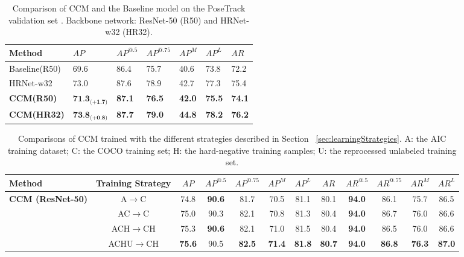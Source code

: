 \documentclass[twocolumn]{svjour3}          \smartqed  \usepackage{natbib}
\begin{document}
\begin{table}[htbp]
\centering
  \caption{Comparison of CCM and the Baseline model on the PoseTrack validation set \citep{Andriluka2018PoseTrack}. Backbone network: ResNet-50 (R50) and HRNet-w32 (HR32).}
\begin{tabular}{p{1.7cm}p{0.8cm}<{\centering}p{0.7cm}<{\centering}p{0.8cm}<{\centering}p{0.6cm}<{\centering}p{0.6cm}<{\centering}p{0.4cm}<{\centering}}
    \toprule
    Method    & $AP$    & $AP^{@.5}$  & $AP^{@.75}$  & $AP^M$   & $AP^L$ & $AR$ \\
    \midrule
    Baseline(R50)  & 69.6  & 86.4  & 75.7  & 40.6  & 73.8 & 72.2\\
    HRNet-w32 & 73.0  & 87.6  & 78.9  & 42.7  & 77.3 & 75.4\\
    \midrule
    \textbf{CCM(R50)} & $\textbf{71.3}_{\textbf{(+1.7)}}$  & \textbf{87.1}  & \textbf{76.5}  & \textbf{42.0}  & \textbf{75.5} & \textbf{74.1} \\
    \textbf{CCM(HR32)} & $\textbf{73.8}_{\textbf{(+0.8)}}$  & \textbf{87.7}  & \textbf{79.0}  & \textbf{44.8}  & \textbf{78.2} & \textbf{76.2} \\
    \bottomrule
    \end{tabular}\label{tab:posetrack}\end{table}

\begin{table*}[htbp]
\centering
  \caption{Comparisons of CCM trained with the different strategies described in Section ~\ref{sec:learningStrategies}. A: the AIC training dataset; C: the COCO training set; H: the hard-negative training samples; U: the reprocessed unlabeled training set.}
    \begin{tabular}{lccccccccccc}
\toprule
      Method  & Training Strategy  & $AP$    & $AP^{@.5}$  & $AP^{@.75}$  & $AP^M$   & $AP^L$   & $AR$ & $AR^{@.5}$  & $AR^{@.75}$ & $AR^M$ & $AR^L$\\
    \midrule
    \multicolumn{1}{c}{\multirow{4}[0]{*}{\textbf{CCM (ResNet-50)}}} & A$\to$C &  74.8  & \textbf{90.6}  & 81.7  & 70.5  & 81.1  & 80.1  & \textbf{94.0}  & 86.1  & 75.7  & 86.5\\
    \multicolumn{1}{c}{} & AC$\to$C &  75.0  & 90.3  & 82.1  & 70.8  & 81.3  & 80.4  & \textbf{94.0}  & 86.7  & 76.0  & 86.6  \\
    \multicolumn{1}{c}{} & ACH$\to$CH &   75.3  & \textbf{90.6}  & 82.1  & 71.0  & 81.5  & 80.4  & \textbf{94.0}  & 86.5  & 76.0  & 86.6  \\
    \multicolumn{1}{c}{} & ACHU$\to$CH &  \textbf{75.6}  & 90.5  & \textbf{82.5}  & \textbf{71.4}  & \textbf{81.8}  & \textbf{80.7}  & \textbf{94.0}  & \textbf{86.8}  & \textbf{76.3}  & \textbf{87.0}  \\
    \bottomrule
    \end{tabular}\label{tab:ablation_trainingStrategy}\end{table*}
\end{document}
